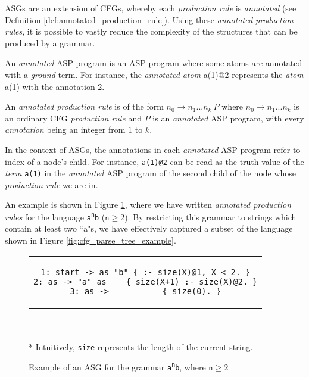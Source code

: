 \noindent
ASGs are an extension of CFGs, whereby each \textit{production rule} is \textit{annotated} (see Definition \ref{def:annotated_production_rule}). Using these \textit{annotated production rules}, it is possible to vastly reduce the complexity of the structures that can be produced by a grammar.

\begin{definition}
An \textit{annotated} ASP program is an ASP program where some atoms are annotated with a \textit{ground} term. For instance, the \textit{annotated} \textit{atom} a(1)@2 represents the \textit{atom} a(1) with the annotation 2.
\end{definition}

\begin{definition}
\label{def:annotated_production_rule}
An \textit{annotated production rule} is of the form $n_0 \to n_1 ... n_k\ P$ where $n_0 \to n_1 ... n_k$ is an ordinary CFG \textit{production rule} and $P$ is an \textit{annotated} ASP program, with every \textit{annotation} being an integer from $1$ to $k$.
\end{definition}

\noindent
In the context of ASGs, the annotations in each \textit{annotated} ASP program refer to index of a node's child. For instance, \texttt{a(1)@2} can be read as the truth value of the \textit{term} \texttt{a(1)} in the \textit{annotated} ASP program of the second child of the node whose \textit{production rule} we are in.

An example is shown in Figure \ref{fig:asg_example}, where we have written \textit{annotated production rules} for the language \texttt{a\textsuperscript{n}b} ($\texttt{n} \ge 2$). By restricting this grammar to strings which contain at least two ``a"s, we have effectively captured a subset of the language shown in Figure \ref{fig:cfg_parse_tree_example}.

\begin{figure}[H]
\centering
\begin{tabular}{c}
\begin{lstlisting}[numbers=none, basicstyle=\ttfamily, columns=fixed, basewidth=0.45em]
1: start -> as "b" { :- size(X)@1, X < 2. }
2: as -> "a" as    { size(X+1) :- size(X)@2. }
3: as ->           { size(0). }
\end{lstlisting}
\end{tabular}
\\ \leavevmode \\ * Intuitively, \texttt{size} represents the length of the current string.
\caption{Example of an ASG for the grammar \texttt{a\textsuperscript{n}b}, where $\texttt{n} \ge 2$}
\label{fig:asg_example}
\end{figure}

